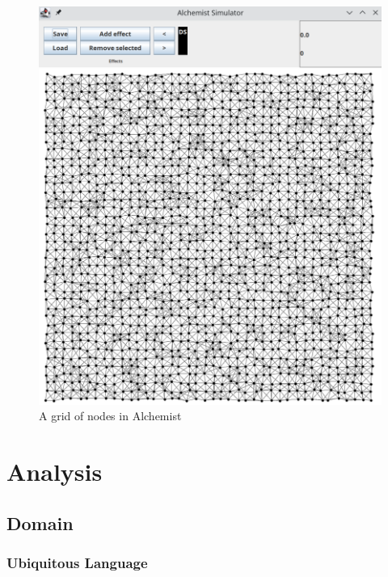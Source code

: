 \documentclass[12pt,a4paper,openright,twoside]{book}
\begin{document}
\begin{figure}[H]
  \centering
  \includegraphics[width=\textwidth]{figures/alchemist.png}
  \caption{A grid of nodes in Alchemist}
\end{figure}

\chapter{Analysis}

\section{Domain}


\subsection*{Ubiquitous Language}
\end{document}
